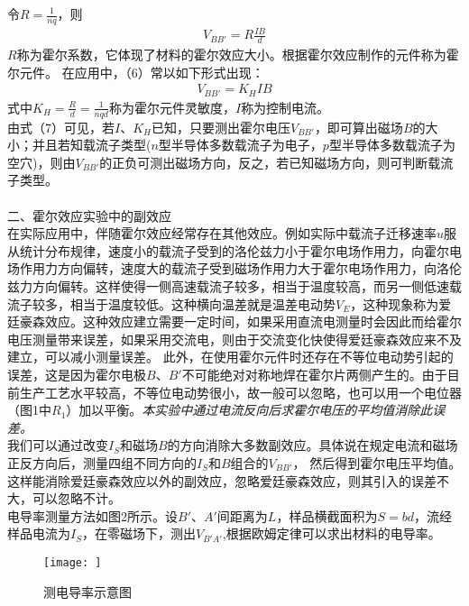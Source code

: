 \documentclass[UTF8]{ctexart}
\begin{document}
令$R=\frac{1}{nq}$，则
\begin{equation}
    \begin{split}
        V_{BB'}=R\frac{IB}{d}     
    \end{split}
\end{equation} 					
$R$称为霍尔系数，它体现了材料的霍尔效应大小。根据霍尔效应制作的元件称为霍尔元件。
在应用中，（6）常以如下形式出现：
\begin{equation}
    \begin{split}
        V_{BB'}=K_{H}IB  
    \end{split}
\end{equation} 
式中$K_{H}=\frac{R}{d}=\frac{1}{nqd}$称为霍尔元件灵敏度，$I$称为控制电流。
~\\ \indent 由式（7）可见，若$I$、$K_{H}$已知，只要测出霍尔电压$V_{BB'}$，即可算出磁场$B$的大小；并且若知载流子类型($n$型半导体多数载流子为电子，$p$型半导体多数载流子为空穴)，则由$V_{BB'}$的正负可测出磁场方向，反之，若已知磁场方向，则可判断载流子类型。
~\\ 
~\\
二、霍尔效应实验中的副效应~\\
\indent 在实际应用中，伴随霍尔效应经常存在其他效应。例如实际中载流子迁移速率$u$服从统计分布规律，速度小的载流子受到的洛伦兹力小于霍尔电场作用力，向霍尔电场作用力方向偏转，速度大的载流子受到磁场作用力大于霍尔电场作用力，向洛伦兹力方向偏转。这样使得一侧高速载流子较多，相当于温度较高，而另一侧低速载流子较多，相当于温度较低。这种横向温差就是温差电动势$V_{E}$，这种现象称为爱廷豪森效应。这种效应建立需要一定时间，如果采用直流电测量时会因此而给霍尔电压测量带来误差，如果采用交流电，则由于交流变化快使得爱廷豪森效应来不及建立，可以减小测量误差。
此外，在使用霍尔元件时还存在不等位电动势引起的误差，这是因为霍尔电极$B$、$B'$不可能绝对对称地焊在霍尔片两侧产生的。由于目前生产工艺水平较高，不等位电动势很小，故一般可以忽略，也可以用一个电位器（图1中$R_{1}$）加以平衡。\textit{本实验中通过电流反向后求霍尔电压的平均值消除此误差。}
~\\ \indent 我们可以通过改变$I_{S}$和磁场$B$的方向消除大多数副效应。具体说在规定电流和磁场正反方向后，测量四组不同方向的$I_{S}$和$B$组合的$V_{BB'}$，
然后得到霍尔电压平均值。这样能消除爱廷豪森效应以外的副效应，忽略爱廷豪森效应，则其引入的误差不大，可以忽略不计。
~\\\indent 电导率测量方法如图2所示。设$B'$、$A'$间距离为$L$，样品横截面积为$S=bd$，流经样品电流为$I_{S}$，在零磁场下，测出$V_{B'A'}$,根据欧姆定律可以求出材料的电导率。
\begin{figure}[H]
    \centering
    \texttt{[image: ]}
    \caption{测电导率示意图}
 \end{figure}
\end{document}
